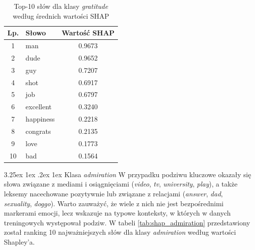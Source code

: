 \documentclass[wmii, inf, mgr]{uwmthesis}
\makeatletter
\renewcommand\paragraph{\@startsection{paragraph}{4}{\z@}%
  {3.25ex \@plus1ex \@minus.2ex}%
  {1ex}%
  {\normalfont\normalsize\bfseries}}
\makeatother
\begin{document}
\begin{table}[H]
	\centering
	\renewcommand{\arraystretch}{1.3}
	\begin{tabular}{|c|l|c|}
		\hline
		\textbf{Lp.} & \textbf{Słowo} & \textbf{Wartość SHAP} \\ \hline
		1 & man         & 0.9673 \\ \hline
		2 & dude        & 0.9652 \\ \hline
		3 & guy         & 0.7207 \\ \hline
		4 & shot        & 0.6917 \\ \hline
		5 & job         & 0.6797 \\ \hline
		6 & excellent   & 0.3240 \\ \hline
		7 & happiness   & 0.2218 \\ \hline
		8 & congrats    & 0.2135 \\ \hline
		9 & love        & 0.1773 \\ \hline
		10 & bad        & 0.1564 \\ \hline
	\end{tabular}
	\caption{Top-10 słów dla klasy \textit{gratitude} według średnich wartości SHAP}
	\label{tab:shap_gratitude}
\end{table}


\paragraph{Klasa \textit{admiration}}
W przypadku podziwu kluczowe okazały się słowa związane z mediami i osiągnięciami (\textit{video}, \textit{tv}, \textit{university}, \textit{play}), a także leksemy nacechowane pozytywnie lub związane z relacjami (\textit{answer}, \textit{dad}, \textit{sexuality}, \textit{doggo}). Warto zauważyć, że wiele z nich nie jest bezpośrednimi markerami emocji, lecz wskazuje na typowe konteksty, w których w danych treningowych występował podziw. W tabeli \ref{tab:shap_admiration} przedstawiony został ranking 10 najważniejszych słów dla klasy \textit{admiration} według wartości Shapley’a.
\end{document}
